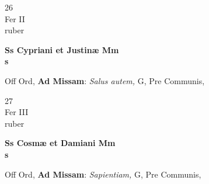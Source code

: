 \documentclass[10pt, openany]{book}
\begin{document}
        \begin{center}
            \begin{minipage}{3.5in}
                \vspace{2em}
                \begin{minipage}{0.5in}
                    {\Huge 26} \\
                    {\normalsize Fer II} \\
                    {\normalsize ruber}
                \end{minipage}
                \begin{minipage}{3.0in}
                    \textbf{ \large Ss Cypriani et Justinæ Mm \\
                    \textnormal{\normalsize s}} \\ 
                \end{minipage}
                \begin{justify}Off Ord, \textbf{Ad Missam}: \textit{Salus autem,} G, Pre Communis,  
                \end{justify}
            \end{minipage}
        \end{center}
    
        \begin{center}
            \begin{minipage}{3.5in}
                \vspace{2em}
                \begin{minipage}{0.5in}
                    {\Huge 27} \\
                    {\normalsize Fer III} \\
                    {\normalsize ruber}
                \end{minipage}
                \begin{minipage}{3.0in}
                    \textbf{ \large Ss Cosmæ et Damiani Mm \\
                    \textnormal{\normalsize s}} \\ 
                \end{minipage}
                \begin{justify}Off Ord, \textbf{Ad Missam}: \textit{Sapientiam,} G, Pre Communis,  
                \end{justify}
            \end{minipage}
        \end{center}
    
\end{document}
